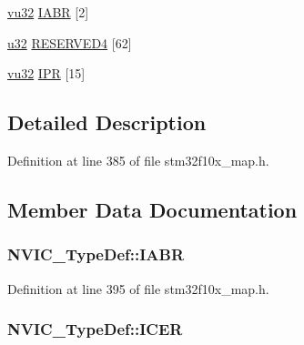 \begin{DoxyCompactItemize}
\item 
\hyperlink{agilefox_2library_2inc_2stm32f10x__type_8h_a6e2761f0a1011f84ed96b946f2c8a563}{vu32} \hyperlink{struct_n_v_i_c___type_def_a45870f8694aba72e95ed609858a60bf7}{I\+A\+BR} \mbox{[}2\mbox{]}
\item 
\hyperlink{agilefox_2library_2inc_2stm32f10x__type_8h_a2caf5cd7bcdbe1eefa727f44ffb10bac}{u32} \hyperlink{struct_n_v_i_c___type_def_ab90221b8a7ac983c4da617fdbaa28d99}{R\+E\+S\+E\+R\+V\+E\+D4} \mbox{[}62\mbox{]}
\item 
\hyperlink{agilefox_2library_2inc_2stm32f10x__type_8h_a6e2761f0a1011f84ed96b946f2c8a563}{vu32} \hyperlink{struct_n_v_i_c___type_def_adebedbb31feecef5c25d9ecd004cb248}{I\+PR} \mbox{[}15\mbox{]}
\end{DoxyCompactItemize}


\subsection{Detailed Description}


Definition at line 385 of file stm32f10x\+\_\+map.\+h.



\subsection{Member Data Documentation}
\subsubsection[{\texorpdfstring{I\+A\+BR}{IABR}}]{ N\+V\+I\+C\+\_\+\+Type\+Def\+::\+I\+A\+BR}\hypertarget{struct_n_v_i_c___type_def_a45870f8694aba72e95ed609858a60bf7}{}\label{struct_n_v_i_c___type_def_a45870f8694aba72e95ed609858a60bf7}


Definition at line 395 of file stm32f10x\+\_\+map.\+h.

\subsubsection[{\texorpdfstring{I\+C\+ER}{ICER}}]{ N\+V\+I\+C\+\_\+\+Type\+Def\+::\+I\+C\+ER}\hypertarget{struct_n_v_i_c___type_def_a9805a9bbff34c3e917a99304fa7d9e74}{}\label{struct_n_v_i_c___type_def_a9805a9bbff34c3e917a99304fa7d9e74}


